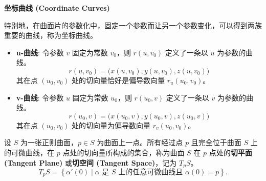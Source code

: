 \documentclass[lang=cn,10pt,thmcnt=section]{elegantbook}
\begin{document}
\noindent\textbf{坐标曲线 (Coordinate Curves)}
\medskip

特别地，在曲面片的参数化中，固定一个参数而让另一个参数变化，可以得到两族重要的曲线，称为坐标曲线。

\begin{itemize}
    \item \textbf{u-曲线}: 令参数 $v$ 固定为常数 $v_0$，则 $r(u, v_0)$ 定义了一条以 $u$ 为参数的曲线。
    \[
    r(u, v_0) = \big(x(u, v_0), y(u, v_0), z(u, v_0)\big)
    \]
    其在点 $(u_0, v_0)$ 处的切向量恰好是偏导数向量 $r_u(u_0, v_0)$。

    \item \textbf{v-曲线}: 令参数 $u$ 固定为常数 $u_0$，则 $r(u_0, v)$ 定义了一条以 $v$ 为参数的曲线。
    \[
    r(u_0, v) = \big(x(u_0, v), y(u_0, v), z(u_0, v)\big)
    \]
    其在点 $(u_0, v_0)$ 处的切向量为偏导数向量 $r_v(u_0, v_0)$。
\end{itemize}
\begin{definition}[切平面]
    设 $S$ 为一张正则曲面，$p \in S$ 为曲面上一点。所有经过点 $p$ 且完全位于曲面 $S$ 上的可微曲线，在 $p$ 点处的切向量所构成的集合，称为曲面 $S$ 在 $p$ 点处的\textbf{切平面 (Tangent Plane)} 或\textbf{切空间 (Tangent Space)}，记为 $T_p S$。
    \[
    T_p S = \left\{ \alpha'(0) \mid \alpha \text{ 是 } S \text{ 上的任意可微曲线且 } \alpha(0)=p \right\}.
    \]
\end{definition}
\end{document}
